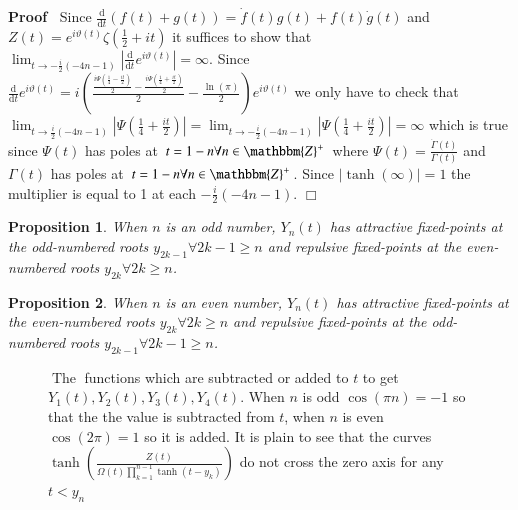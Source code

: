 \documentclass{elsarticle}
\newcommand{\mathd}{\mathrm{d}}
\newcommand{\tmop}[1]{\ensuremath{\operatorname{#1}}}
\newenvironment{proof}{\noindent\textbf{Proof\ }}{\hspace*{\fill}$\Box$\medskip}
\newtheorem{proposition}{Proposition}
{\theorembodyfont{\rmfamily}\newtheorem{remark}{Remark}}
\begin{document}
\begin{proof}
  Since $\frac{\mathd}{\mathd t} (f (t) + g (t)) = \dot{f} (t) g (t) + f (t)
  \dot{g} (t)$ and $Z (t) = e^{i \vartheta (t)} \zeta \left( \frac{1}{2} + i t
  \right)$ it suffices to show that $\lim_{t \rightarrow - \frac{i}{2} (- 4 n
  - 1)} \left| \frac{\mathd}{\mathd t} e^{i \vartheta (t)} \right| = \infty$.
  Since $\frac{\mathd}{\mathd t} e^{i \vartheta (t)} = i \left( \frac{\frac{i
  \Psi \left( \frac{1}{4} - \frac{i t}{2} \right)}{2} - \frac{i \Psi \left(
  \frac{1}{4} + \frac{i t}{2} \right)}{2}}{2} - \frac{\ln (\pi)}{2} \right)
  e^{i \vartheta (t)}$ we only have to check that $\lim_{t \rightarrow
  \frac{i}{2} (- 4 n - 1)} \left| \Psi \left( \frac{1}{4} + \frac{i t}{2}
  \right) \right| = \lim_{t \rightarrow - \frac{i}{2} (- 4 n - 1)} \left| \Psi
  \left( \frac{1}{4} + \frac{i t}{2} \right) \right| = \infty$ which is true
  since $\Psi (t)$ has poles at $t = 1 - n \forall n \in \mathbbm{Z}^+$ where
  $\Psi (t) = \frac{\dot{\Gamma} (t)}{\Gamma (t)}$ and $\Gamma (t)$ has poles
  at $t = 1 - n \forall n \in \mathbbm{Z}^+$. Since $| \tanh (\infty) | = 1$
  the multiplier is equal to 1 at each $- \frac{i}{2} (- 4 n - 1)$.
\end{proof}

\begin{proposition}
  \label{podd}When $n$ is an odd number, $Y_n (t)$ has attractive fixed-points
  at the odd-numbered roots $y_{2 k - 1} \forall 2 k - 1 \geqslant n$ and
  repulsive fixed-points at the even-numbered roots $y_{2 k} \forall 2 k
  \geqslant n$.
\end{proposition}

\begin{proposition}
  \label{peven}When $n$ is an even number, $Y_n (t)$ has attractive
  fixed-points at the even-numbered roots $y_{2 k} \forall 2 k \geqslant n$
  and repulsive fixed-points at the odd-numbered roots $y_{2 k - 1} \forall 2
  k - 1 \geqslant n$.
\end{proposition}

\begin{figure}[h]
  \caption{$\tmop{The}$ functions which are subtracted or added to $t$ to get
  $Y_1 (t), Y_2 (t), Y_3 (t), Y_4 (t)$. When $n$ is odd $\cos (\pi n) = - 1$
  so that the the value is subtracted from $t$, when $n$ is even $\cos (2 \pi)
  = 1$ so it is added. It is plain to see that the curves $\tanh \left(
  \frac{Z (t)}{\Omega (t) \prod_{k = 1}^{n - 1} \tanh (t - y_k)} \right)$ do
  not cross the zero axis for any $t < y_n$ }
\end{figure}
\end{document}
